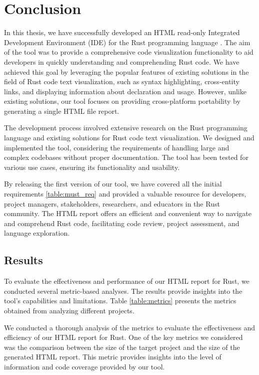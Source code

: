 \chapter{Conclusion}
\label{chap:conclusion}

In this thesis, we have successfully developed an HTML read-only Integrated Development Environment (IDE) for the Rust programming language \cite{sevenzing_2023_8017323}. The aim of the tool was to provide a comprehensive code visualization functionality to aid developers in quickly understanding and comprehending Rust code. We have achieved this goal by leveraging the popular features of existing solutions in the field of Rust code text visualization, such as syntax highlighting, cross-entity links, and displaying information about declaration and usage. However, unlike existing solutions, our tool focuses on providing cross-platform portability by generating a single HTML file report.

The development process involved extensive research on the Rust programming language and existing solutions for Rust code text visualization. We designed and implemented the tool, considering the requirements of handling large and complex codebases without proper documentation. The tool has been tested for various use cases, ensuring its functionality and usability.

By releasing the first version of our tool, we have covered all the initial requirements \ref{table:must_req} and provided a valuable resource for developers, project managers, stakeholders, researchers, and educators in the Rust community. The HTML report offers an efficient and convenient way to navigate and comprehend Rust code, facilitating code review, project assessment, and language exploration.

\section{Results}

To evaluate the effectiveness and performance of our HTML report for Rust, we conducted several metric-based analyses. The results provide insights into the tool's capabilities and limitations. Table \ref{table:metrics} presents the metrics obtained from analyzing different projects.

We conducted a thorough analysis of the metrics to evaluate the effectiveness and efficiency of our HTML report for Rust. One of the key metrics we considered was the comparison between the size of the target project and the size of the generated HTML report. This metric provides insights into the level of information and code coverage provided by our tool.


